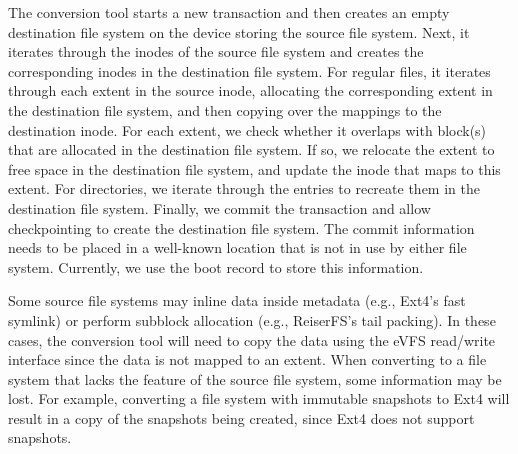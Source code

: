 The conversion tool starts a new transaction and then creates an empty destination file system on the device storing the source file system. Next, it iterates through the inodes of the source file system and creates the corresponding inodes in the destination file system. For regular files, it iterates through each extent in the source inode, allocating the corresponding extent in the destination file system, and then copying over the mappings to the destination inode. For each extent, we check whether it overlaps with block(s) that are allocated in the destination file system. If so, we relocate the extent to free space in the destination file system, and update the inode that maps to this extent. For directories, we iterate through the entries to recreate them in the destination file system. Finally, we commit the transaction and allow checkpointing to create the destination file system. The commit information needs to be placed in a well-known location that is not in use by either file system. Currently, we use the boot record to store this information.

Some source file systems may inline data inside metadata (e.g., Ext4's fast symlink) or perform subblock allocation (e.g., ReiserFS's tail packing). In these cases, the conversion tool will need to copy the data using the eVFS read/write interface since the data is not mapped to an extent. When converting to a file system that lacks the feature of the source file system, some information may be lost. For example, converting a file system with immutable snapshots to Ext4 will result in a copy of the snapshots being created, since Ext4 does not support snapshots. 





